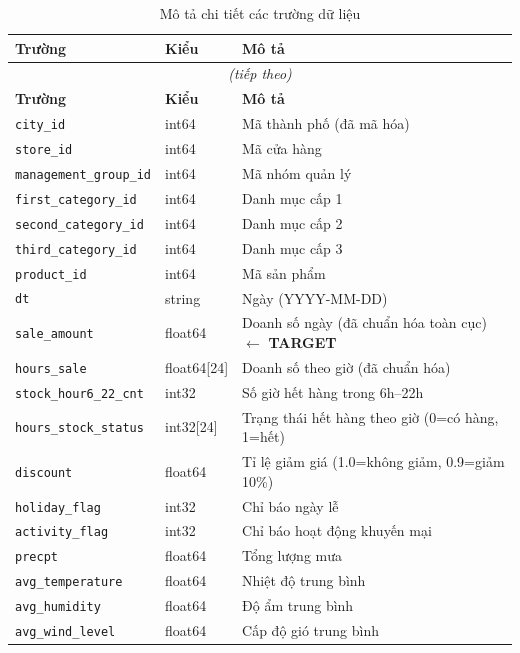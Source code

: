 \documentclass[12pt,a4paper]{report}
\begin{document}
\begin{longtable}{lp{2.5cm}p{7.5cm}}
\caption{Mô tả chi tiết các trường dữ liệu} \\
\toprule
\textbf{Trường} & \textbf{Kiểu} & \textbf{Mô tả} \\
\midrule
\endfirsthead
\multicolumn{3}{c}{\textit{(tiếp theo)}} \\
\toprule
\textbf{Trường} & \textbf{Kiểu} & \textbf{Mô tả} \\
\midrule
\endhead
\texttt{city\_id}            & int64    & Mã thành phố (đã mã hóa) \\
\texttt{store\_id}           & int64    & Mã cửa hàng \\
\texttt{management\_group\_id} & int64  & Mã nhóm quản lý \\
\texttt{first\_category\_id}  & int64   & Danh mục cấp 1 \\
\texttt{second\_category\_id} & int64   & Danh mục cấp 2 \\
\texttt{third\_category\_id}  & int64   & Danh mục cấp 3 \\
\texttt{product\_id}         & int64    & Mã sản phẩm \\
\texttt{dt}                  & string   & Ngày (YYYY-MM-DD) \\
\texttt{sale\_amount}        & float64  & Doanh số ngày (đã chuẩn hóa toàn cục) $\leftarrow$ \textbf{TARGET} \\
\texttt{hours\_sale}         & float64[24] & Doanh số theo giờ (đã chuẩn hóa) \\
\texttt{stock\_hour6\_22\_cnt}& int32   & Số giờ hết hàng trong 6h--22h \\
\texttt{hours\_stock\_status} & int32[24] & Trạng thái hết hàng theo giờ (0=có hàng, 1=hết) \\
\texttt{discount}            & float64  & Tỉ lệ giảm giá (1.0=không giảm, 0.9=giảm 10\%) \\
\texttt{holiday\_flag}       & int32    & Chỉ báo ngày lễ \\
\texttt{activity\_flag}      & int32    & Chỉ báo hoạt động khuyến mại \\
\texttt{precpt}              & float64  & Tổng lượng mưa \\
\texttt{avg\_temperature}    & float64  & Nhiệt độ trung bình \\
\texttt{avg\_humidity}       & float64  & Độ ẩm trung bình \\
\texttt{avg\_wind\_level}    & float64  & Cấp độ gió trung bình \\
\bottomrule
\end{longtable}
\end{document}

